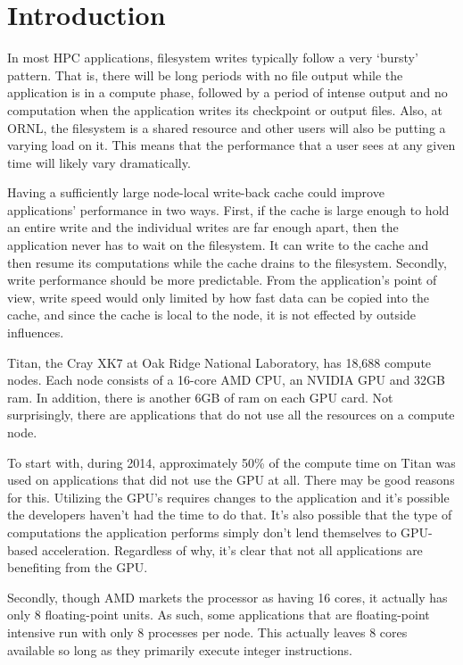 \section{Introduction}
\label{sec:intro}

In most HPC applications, filesystem writes typically follow a very `bursty' pattern. That is, there will be long periods with no file output while the application is in a compute phase, followed by a period of intense output and no computation when the application writes its checkpoint or output files.  Also, at ORNL, the filesystem is a shared resource and other users will also be putting a varying load on it. This means that the performance that a user sees at any given time will likely vary dramatically.

Having a sufficiently large node-local write-back cache could improve applications' performance in two ways.  First, if the cache is large enough to hold an entire write and the individual writes are far enough apart, then the application never has to wait on the filesystem.  It can write to the cache and then resume its computations while the cache drains to the filesystem.  Secondly, write performance should be more predictable. From the application's point of view, write speed would only limited by how fast data can be copied into the cache, and since the cache is local to the node, it is not effected by outside influences.

Titan, the Cray XK7 at Oak Ridge National Laboratory, has 18,688 compute nodes. Each node consists of a 16-core AMD CPU, an NVIDIA GPU and 32GB ram. In addition, there is another 6GB of ram on each GPU card. Not surprisingly, there are applications that do not use all the resources on a compute node.

To start with, during 2014, approximately 50\% of the compute time on Titan was used on applications that did not use the GPU at all.\cite{oareport}
There may be good reasons for this.  Utilizing the GPU's requires changes to the application and it's possible the developers haven't had the time to do that.  It's also possible that the type of computations the application performs simply don't lend themselves to GPU-based acceleration.  Regardless of why, it's clear that not all applications are benefiting from the GPU.

Secondly, though AMD markets the processor as having 16 cores, it actually has only 8 floating-point units. As such, some applications that are floating-point intensive run with only 8 processes per node. This actually leaves 8 cores available so long as they primarily execute integer instructions. 

